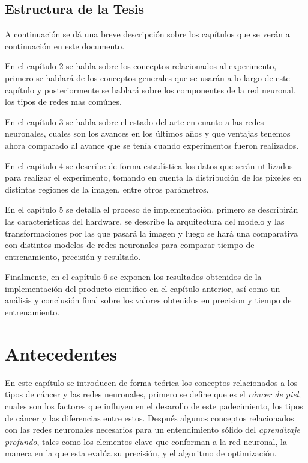 \section{Estructura de la Tesis}

A continuación se dá una breve descripción sobre los capítulos que se verán a continuación en este documento.

En el capítulo 2 se habla sobre los conceptos relacionados al experimento, primero se hablará de los conceptos generales que se usarán a lo largo de este capítulo y posteriormente se hablará sobre los componentes de la red neuronal, los tipos de redes mas comúnes. 

En el capítulo 3 se habla sobre el estado del arte en cuanto a las redes neuronales, cuales son los avances en los últimos años y que ventajas tenemos ahora comparado al avance que se tenía cuando experimentos fueron realizados.

En el capitulo 4 se describe de forma estadística los datos que serán utilizados para realizar el experimento, tomando en cuenta la distribución de los pixeles en distintas regiones de la imagen, entre otros parámetros. 

En el capítulo 5 se detalla el proceso de implementación, primero se describirán las características del hardware, se describe la arquitectura del modelo y las transformaciones por las que pasará la imagen y luego se hará una comparativa con distintos modelos de redes neuronales para comparar tiempo de entrenamiento, precisión y resultado.

Finalmente, en el capítulo 6 se exponen los resultados obtenidos de la implementación del producto científico en el capítulo anterior, así como un análisis y conclusión final sobre los valores obtenidos en precision y tiempo de entrenamiento. 

\chapter{Antecedentes}
En este capítulo se introducen de forma teórica los conceptos relacionados a los tipos de cáncer y las redes neuronales, primero se define que es el \emph{cáncer de piel}, cuales son los factores que influyen en el desarollo de este padecimiento, los tipos de cáncer y las diferencias entre estos. Después algunos conceptos relacionados con las redes neuronales necesarios para un entendimiento sólido del \emph{aprendizaje profundo}, tales como los elementos clave que conforman a la red neuronal, la manera en la que esta evalúa su precisión, y el algoritmo de optimización.

